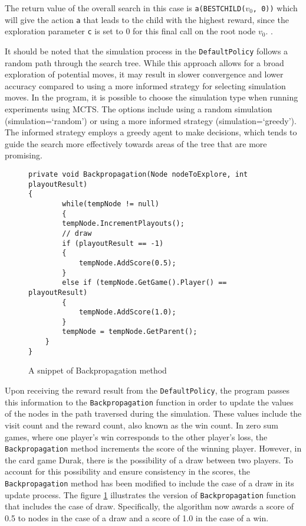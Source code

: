 The return value of the overall search in this case is \texttt{a(BESTCHILD($v_0$, 0))} which will give the action \texttt{a} that leads to the child with the highest reward, since the exploration parameter \texttt{c} is set to 0 for this final call on the root node $v_0$. \citep{MCTSSurvey}.

It should be noted that the simulation process in the \texttt{DefaultPolicy} follows a random path through the search tree. While this approach allows for a broad exploration of potential moves, it may result in slower convergence and lower accuracy compared to using a more informed strategy for selecting simulation moves. In the program, it is possible to choose the simulation type when running experiments using MCTS. The options include using a random simulation (simulation=`random') or using a more informed strategy (simulation=`greedy'). The informed strategy employs a greedy agent to make decisions, which tends to guide the search more effectively towards areas of the tree that are more promising.

\begin{figure}[h]
\captionsetup{justification=centering}
\begin{lstlisting}
private void Backpropagation(Node nodeToExplore, int playoutResult)
{
    	while(tempNode != null)
    	{
		tempNode.IncrementPlayouts();
		// draw
		if (playoutResult == -1)
		{
			tempNode.AddScore(0.5);
		} 
		else if (tempNode.GetGame().Player() == playoutResult)
		{
			tempNode.AddScore(1.0);
		}
		tempNode = tempNode.GetParent();
	}
}
\end{lstlisting}
\caption{A snippet of Backpropagation method}
\label{fig:mctsBackpropagation}
\end{figure}

Upon receiving the reward result from the \texttt{DefaultPolicy}, the program passes this information to the \texttt{Backpropagation} function in order to update the values of the nodes in the path traversed during the simulation. These values include the visit count and the reward count, also known as the win count. In zero sum games, where one player's win corresponds to the other player's loss, the \texttt{Backpropagation} method increments the score of the winning player. However, in the card game Durak, there is the possibility of a draw between two players. To account for this possibility and ensure consistency in the scores, the \texttt{Backpropagation} method has been modified to include the case of a draw in its update process. The figure \ref{fig:mctsBackpropagation} illustrates the version of \texttt{Backpropagation} function that includes the case of draw. Specifically, the algorithm now awards a score of 0.5 to nodes in the case of a draw and a score of 1.0 in the case of a win.  


